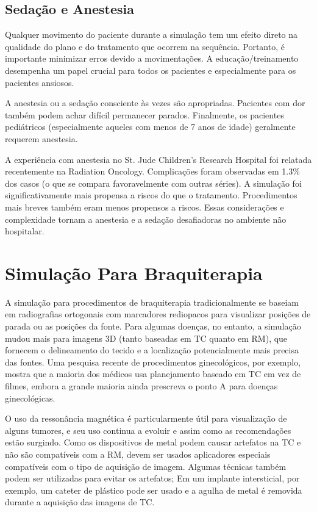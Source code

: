 \documentclass[11pt,a4paper]{article}
\newcounter{exemplo}
\begin{document}
\subsection*{Sedação e Anestesia}

	Qualquer movimento do paciente durante a simulação tem um efeito direto na qualidade do plano e do tratamento que ocorrem na sequência. Portanto, é importante minimizar erros devido a movimentações. A educação/treinamento desempenha um papel crucial para todos os pacientes e especialmente para os pacientes ansiosos.

	A anestesia ou a sedação consciente às vezes são apropriadas. Pacientes com dor também podem achar difícil permanecer parados. Finalmente, os pacientes pediátricos (especialmente aqueles com menos de 7 anos de idade) geralmente requerem anestesia. 
	
	A experiência com anestesia no St. Jude Children's Research Hospital foi relatada recentemente na  Radiation Oncology. Complicações foram observadas em 1.3\% dos casos (o que se compara favoravelmente com outras séries). A simulação foi significativamente mais propensa a riscos do que o tratamento. Procedimentos mais breves também eram menos propensos a riscos. Essas considerações e complexidade tornam a anestesia e a sedação desafiadoras no ambiente não hospitalar. 

\section{Simulação Para Braquiterapia}

	A simulação para procedimentos de braquiterapia tradicionalmente se baseiam em radiografias ortogonais com marcadores rediopacos para visualizar posições de parada ou as posições da fonte. Para algumas doenças, no entanto, a simulação mudou mais para imagens 3D (tanto baseadas em TC quanto em RM), que fornecem o delineamento do tecido e a localização potencialmente mais precisa das fontes. Uma pesquisa recente de procedimentos ginecológicos, por exemplo, mostra que a maioria dos médicos usa planejamento baseado em TC em vez de filmes, embora a grande maioria ainda prescreva o ponto A para doenças ginecológicas.
	
	O uso da ressonância magnética é particularmente útil para visualização de alguns tumores, e seu uso continua a evoluir e assim como as recomendações estão surgindo. Como os dispositivos de metal podem causar artefatos na TC e não são compatíveis com a RM, devem ser usados aplicadores especiais compatíveis com o tipo de aquisição de imagem. Algumas técnicas também podem ser utilizadas para evitar os artefatos; Em um implante intersticial, por exemplo, um cateter de plástico pode ser usado e a agulha de metal é removida durante a aquisição das imagens de TC.



\end{document}
